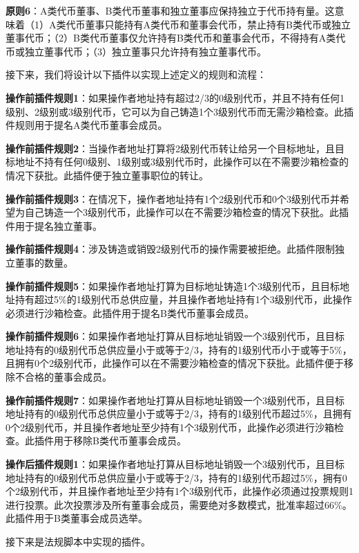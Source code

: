 \documentclass[main.tex]{subfiles}
\begin{document}
\textbf{原则6}：A类代币董事、B类代币董事和独立董事应保持独立于代币持有量。这意味着（1）A类代币董事只能持有A类代币和董事会代币，禁止持有B类代币或独立董事代币；（2）B类代币董事仅允许持有B类代币和董事会代币，不得持有A类代币或独立董事代币；（3）独立董事只允许持有独立董事代币。

接下来，我们将设计以下插件以实现上述定义的规则和流程：

\textbf{操作前插件规则1}：如果操作者地址持有超过2/3的0级别代币，并且不持有任何1级别、2级别或3级别代币，它可以为自己铸造1个3级别代币而无需沙箱检查。此插件规则用于提名A类代币董事会成员。

\textbf{操作前插件规则2}：当操作者地址打算将2级别代币转让给另一个目标地址，且目标地址不持有任何0级别、1级别或3级别代币时，此操作可以在不需要沙箱检查的情况下获批。此插件便于独立董事职位的转让。

\textbf{操作前插件规则3}：在情况下，操作者地址持有1个2级别代币和0个3级别代币并希望为自己铸造一个3级别代币，此操作可以在不需要沙箱检查的情况下获批。此插件用于提名独立董事。

\textbf{操作前插件规则4}：涉及铸造或销毁2级别代币的操作需要被拒绝。此插件限制独立董事的数量。

\textbf{操作前插件规则5}：如果操作者地址打算为目标地址铸造1个3级别代币，且目标地址持有超过5\%的1级别代币总供应量，并且操作者地址持有1个3级别代币，此操作必须进行沙箱检查。此插件用于提名B类代币董事会成员。

\textbf{操作前插件规则6}：如果操作者地址打算从目标地址销毁一个3级别代币，且目标地址持有的0级别代币总供应量小于或等于2/3，持有的1级别代币小于或等于5\%，且拥有0个2级别代币，此操作可以在不需要沙箱检查的情况下获批。此插件便于移除不合格的董事会成员。

\textbf{操作前插件规则7}：如果操作者地址打算从目标地址销毁一个3级别代币，且目标地址持有的0级别代币总供应量小于或等于2/3，持有的1级别代币超过5\%，且拥有0个2级别代币，并且操作者地址至少持有1个3级别代币，此操作必须进行沙箱检查。此插件用于移除B类代币董事会成员。

\textbf{操作后插件规则1}：如果操作者地址打算从目标地址销毁一个3级别代币，且目标地址持有的0级别代币总供应量小于或等于2/3，持有的1级别代币超过5\%，拥有0个2级别代币，并且操作者地址至少持有1个3级别代币，此操作必须通过投票规则1进行投票。此次投票涉及所有董事会成员，需要绝对多数模式，批准率超过66\%。此插件用于B类董事会成员选举。

接下来是法规脚本中实现的插件。
\end{document}
